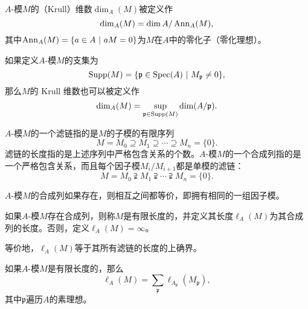 \begin{definition}
$A$-模$M$的（Krull）维数$\dim_A(M)$被定义作
\begin{equation}
\dim_A(M) = \dim A/\operatorname{Ann}_A(M),
\end{equation}
其中$\operatorname{Ann}_A(M) = \{a\in A \ |\ aM = 0\}$为$M$在$A$中的零化子（零化理想）。
\end{definition}

\begin{remark}
如果定义$A$-模$M$的支集为
\begin{equation}
\operatorname{Supp}(M) = \{ \mathfrak{p} \in \operatorname{Spec}(A) \ |\ M_{\mathfrak{p}} \neq 0 \},
\end{equation}
那么$M$的 Krull 维数也可以被定义作
\begin{equation}
\dim_A(M) = \sup\limits_{\mathfrak{p}\in \operatorname{Supp}(M)} \dim(A/\mathfrak{p}).
\end{equation}
\end{remark}

\begin{definition}
$A$-模$M$的一个滤链指的是$M$的子模的有限序列
\begin{equation}
M = M_0 \supseteq M_1 \supseteq \cdots \supseteq M_n = \{0\}.
\end{equation}
滤链的长度指的是上述序列中严格包含关系的个数。$A$-模$M$的一个合成列指的是一个严格包含关系，而且每个因子模$M_i/M_{i+1}$都是单模的滤链：
\begin{equation}
M = M_0 \supsetneqq M_1 \supsetneqq \cdots \supsetneqq M_n = \{0\}.
\end{equation}
\end{definition}

\begin{remark}
$A$-模$M$的合成列如果存在，则相互之间都等价，即拥有相同的一组因子模。
\end{remark}

\begin{definition} \label{length of a module}
如果$A$-模$M$存在合成列，则称$M$是有限长度的，并定义其长度$\ell_A(M)$为其合成列的长度。否则，定义$\ell_A(M) = \infty$。
\end{definition}
等价地，$\ell_A(M)$等于其所有滤链的长度的上确界。

\begin{lemma} 
如果$A$-模$M$是有限长度的，那么
\begin{equation}
\ell_A(M) = \sum\limits_{\mathfrak{p}} \ell_{A_{\mathfrak{p}}}(M_{\mathfrak{p}}),
\end{equation}
其中$\mathfrak{p}$遍历$A$的素理想。
\end{lemma}

